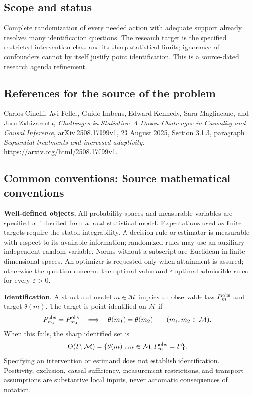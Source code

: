 \documentclass[11pt,a4paper]{article}
\begin{document}
\subsection*{Scope and status}
Complete randomization of every needed action with adequate support already resolves many identification questions. The research target is the specified restricted-intervention class and its sharp statistical limits; ignorance of confounders cannot by itself justify point identification. This is a source-dated research agenda refinement.
\subsection*{References for the source of the problem}
Carlos Cinelli, Avi Feller, Guido Imbens, Edward Kennedy, Sara Magliacane, and Jose Zubizarreta, \emph{Challenges in Statistics: A Dozen Challenges in Causality and Causal Inference}, arXiv:2508.17099v1, 23 August 2025, Section 3.1.3, paragraph \emph{Sequential treatments and increased adaptivity}. \url{https://arxiv.org/html/2508.17099v1}.

\subsection*{Common conventions: Source mathematical conventions}

\textbf{Well-defined objects.}
All probability spaces and measurable variables are specified or inherited
from a local statistical model. Expectations used as finite targets require
the stated integrability. A decision rule or estimator is measurable with
respect to its available information; randomized rules may use an auxiliary
independent random variable. Norms without a subscript are Euclidean in
finite-dimensional spaces. An optimizer is requested only when attainment
is assured; otherwise the question concerns the optimal value and
$\varepsilon$-optimal admissible rules for every $\varepsilon>0$.

\textbf{Identification.}
A structural model $m\in\mathcal M$ implies an observable law
$P_m^{\rm obs}$ and target $\theta(m)$. The target is point identified on
$\mathcal M$ if
\[
 P_{m_1}^{\rm obs}=P_{m_2}^{\rm obs}
 \quad\Longrightarrow\quad\theta(m_1)=\theta(m_2)
 \qquad(m_1,m_2\in\mathcal M).
\]
When this fails, the sharp identified set is
\[
 \Theta(P;\mathcal M)=\{\theta(m):m\in\mathcal M,
                                  P_m^{\rm obs}=P\}.
\]
Specifying an intervention or estimand does not establish identification.
Positivity, exclusion, causal sufficiency, measurement restrictions, and
transport assumptions are substantive local inputs, never automatic
consequences of notation.
\end{document}
